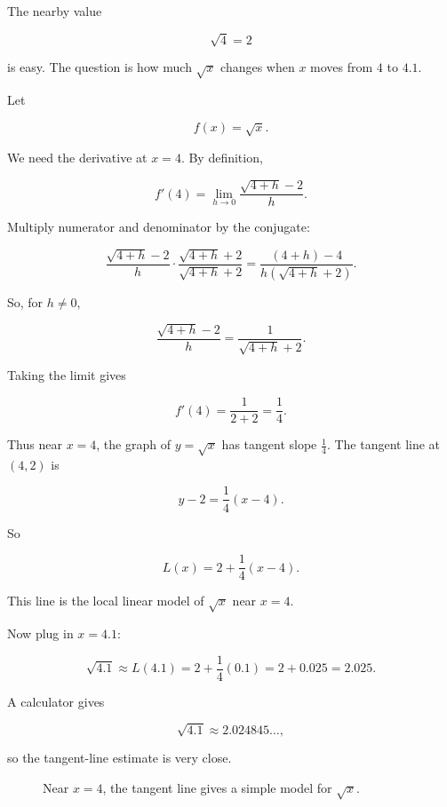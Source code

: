 The nearby value

\[
\sqrt4=2
\]

is easy.  The question is how much \(\sqrt{x}\) changes when \(x\) moves from \(4\) to \(4.1\).

Let

\[
f(x)=\sqrt{x}.
\]

We need the derivative at \(x=4\).  By definition,

\[
f'(4)
=
\lim_{h\to0}\frac{\sqrt{4+h}-2}{h}.
\]

Multiply numerator and denominator by the conjugate:

\[
\frac{\sqrt{4+h}-2}{h}
\cdot
\frac{\sqrt{4+h}+2}{\sqrt{4+h}+2}
=
\frac{(4+h)-4}{h(\sqrt{4+h}+2)}.
\]

So, for \(h\neq0\),

\[
\frac{\sqrt{4+h}-2}{h}
=
\frac{1}{\sqrt{4+h}+2}.
\]

Taking the limit gives

\[
f'(4)=\frac{1}{2+2}=\frac14.
\]

Thus near \(x=4\), the graph of \(y=\sqrt{x}\) has tangent slope \(\frac14\).  The tangent line at \((4,2)\) is

\[
y-2=\frac14(x-4).
\]

So

\[
L(x)=2+\frac14(x-4).
\]

This line is the local linear model of \(\sqrt{x}\) near \(x=4\).

Now plug in \(x=4.1\):

\[
\sqrt{4.1}
\approx
L(4.1)
=
2+\frac14(0.1)
=
2+0.025
=
2.025.
\]

A calculator gives

\[
\sqrt{4.1}\approx2.024845\ldots,
\]

so the tangent-line estimate is very close.

\begin{figure}[h]
\centering
{}
\caption{Near \(x=4\), the tangent line gives a simple model for \(\sqrt{x}\).}
\label{fig:sqrt-local-linear}
\end{figure}


